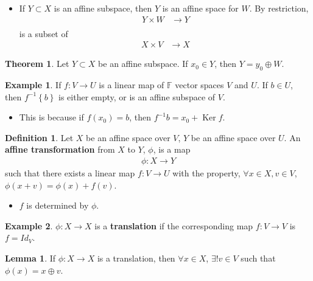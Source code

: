 \documentclass[letterpaper,12pt]{article}
\theoremstyle{definition}
\newtheorem*{definition}{Definition}
\newtheorem*{theorem}{Theorem}
\newtheorem*{example}{Example}
\newtheorem*{lemma}{Lemma}
\newcommand{\set}[1]{\left\{ #1 \right\}}
\DeclareMathOperator{\ker}{Ker}
\begin{document}
\begin{itemize}
    \item If $Y \subset X$ is an affine subspace, then $Y$ is an affine space for $W$. By restriction,
    \begin{align*}
        Y \times W & \longrightarrow Y \\
    \end{align*}
    is a subset of 
    \begin{align*}
        X \times V & \longrightarrow X
    \end{align*}
\end{itemize}

\begin{theorem}
Let $Y \subset X$ be an affine subspace. If $x_0 \in Y$, then $Y = y_0 \oplus W$.
\end{theorem}


\begin{example}
If $f: V \rightarrow U$ is a linear map of $\mathbb{F}$ vector spaces $V$ and $U$. If $b \in U$, then $f^{-1}\set{b}$ is either empty, or is an affine subspace of $V$.
\begin{itemize}
    \item This is because if $f(x_0) = b$, then $f^{-1}{b} = x_0 + \ker{f}$.
\end{itemize}
\end{example}


\begin{definition}
Let $X$ be an affine space over $V$, $Y$ be an affine space over $U$. An \textbf{affine transformation} from $X$ to $Y$, $\phi$, is a map
\begin{align*}
    \phi : X \longrightarrow Y
\end{align*}
such that there exists a linear map $f: V \longrightarrow U$ with the property, $\forall x \in X, v \in V$, $\phi(x + v) = \phi(x) + f(v)$.
\begin{itemize}
    \item $f$ is determined by $\phi$.
\end{itemize}
\end{definition}

\begin{example}
$\phi: X \rightarrow X$ is a \textbf{translation} if the corresponding map $f: V \rightarrow V$ is $f = Id_{V}$.
\end{example}

\begin{lemma}
If $\phi : X \rightarrow X$ is a translation, then $\forall x \in X$, $\exists ! v \in V$ such that $\phi(x) = x \oplus v$.
\end{lemma}
\end{document}
